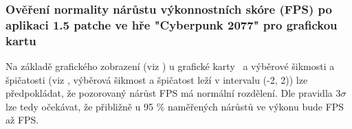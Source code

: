 \subsubsection*{Ověření normality nárůstu výkonnostních skóre (FPS) po aplikaci 1.5 patche ve hře "Cyberpunk 2077" pro grafickou kartu \amdCardSedm}

Na základě grafického zobrazení (viz ) u grafické karty \amdCardSedm\ a výběrové šikmosti a špičatosti (viz ,
výběrová šikmost a špičatost leží v intervalu (-2, 2)) lze předpokládat, že pozorovaný nárůst FPS má normální rozdělení. Dle pravidla 3$\sigma$ lze tedy očekávat,
že přibližně u 95 \% naměřených nárůstů ve výkonu bude  FPS až  FPS\@.

\endinput
